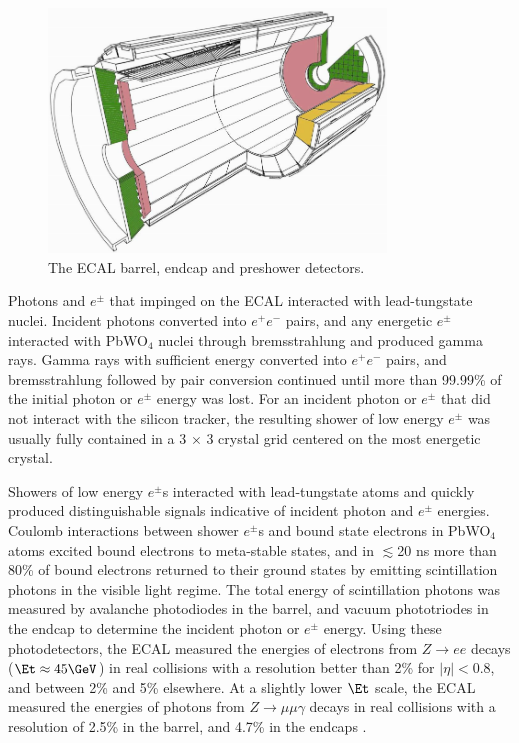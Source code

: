 \begin{figure}[ht]
	\centering
	\includegraphics[width=0.8\textwidth]{figures/ecalBarrelEndcapAndPreshower.png}
	\caption{The ECAL barrel, endcap and preshower detectors.}
	\label{fig:ecalEBEEandES}
\end{figure}

Photons and $e^{\pm}$ that impinged on the ECAL interacted with lead-tungstate nuclei.  Incident photons 
converted into $e^{+}e^{-}$ pairs, and any energetic $e^{\pm}$ interacted with PbWO$_{4}$ nuclei through 
bremsstrahlung and produced gamma rays.  Gamma rays with sufficient energy converted into $e^{+}e^{-}$ pairs, 
and bremsstrahlung followed by pair conversion continued until more than 99.99\% of the initial photon or 
$e^{\pm}$ energy was lost.  For an incident photon or $e^{\pm}$ that did not interact with the silicon 
tracker, the resulting shower of low energy $e^{\pm}$ was usually fully contained in a 3 $\times$ 3 crystal 
grid centered on the most energetic crystal.

Showers of low energy $e^{\pm}$s interacted with lead-tungstate atoms and quickly produced distinguishable 
signals indicative of incident photon and $e^{\pm}$ energies.  Coulomb interactions between shower $e^{\pm}$s 
and bound state electrons in PbWO$_{4}$ atoms excited bound electrons to meta-stable states, and in 
$\lesssim$20 ns more than 80\% of bound electrons returned to their ground states by emitting scintillation 
photons in the visible light regime.  The total energy of 
scintillation photons was measured by avalanche photodiodes in the barrel, and vacuum phototriodes in the 
endcap to determine the incident photon or $e^{\pm}$ energy.  Using these photodetectors, the ECAL measured 
the energies of electrons from $Z \rightarrow ee$ decays ($\Et \approx 45 \GeV$) in real collisions with a resolution 
better than 2\% for $|\eta| < 0.8$, and between 2\% and 5\% elsewhere.  
At a slightly lower $\Et$ scale, the ECAL measured the energies of photons from $Z \rightarrow \mu\mu\gamma$ 
decays in real collisions with a resolution of 2.5\% in the barrel, and 4.7\% in the endcaps \cite{ecalPerformanceInCollisions}.

